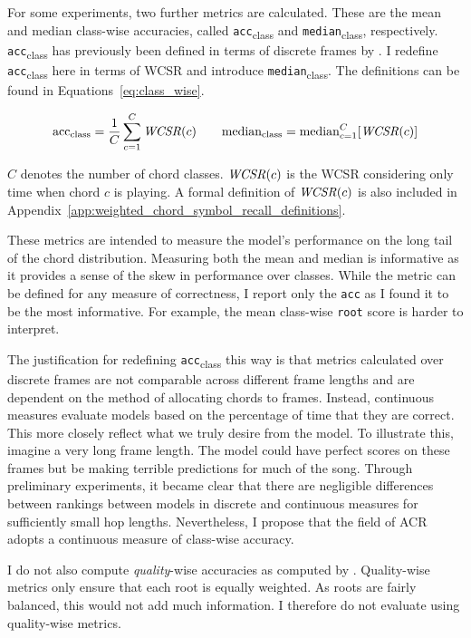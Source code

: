 For some experiments, two further metrics are calculated. These are the mean and median class-wise accuracies, called \texttt{acc}\textsubscript{class} and \texttt{median}\textsubscript{class}, respectively. \texttt{acc}\textsubscript{class} has previously been defined in terms of discrete frames by \citet{ACRLargeVocab1}. I redefine \texttt{acc}\textsubscript{class} here in terms of WCSR and introduce \texttt{median}\textsubscript{class}. The definitions can be found in Equations~\ref{eq:class_wise}.

\begin{equation}\label{eq:class_wise}
    \text{acc}\textsubscript{class} = \frac{1}{C} \sum_{c=1}^{C} \text{\emph{WCSR}}(c)
\quad \quad
    \text{median}\textsubscript{class} = \text{median}_{c=1}^{C} [\text{\emph{WCSR}}(c)]
\end{equation}

$C$ denotes the number of chord classes. $\text{\emph{WCSR}}(c)$ is the WCSR considering only time when chord $c$ is playing. A formal definition of $\text{\emph{WCSR}}(c)$ is also included in Appendix~\ref{app:weighted_chord_symbol_recall_definitions}.

These metrics are intended to measure the model's performance on the long tail of the chord distribution. Measuring both the mean and median is informative as it provides a sense of the skew in performance over classes. While the metric can be defined for any measure of correctness, I report only the \texttt{acc} as I found it to be the most informative. For example, the mean class-wise \texttt{root} score is harder to interpret.

The justification for redefining \texttt{acc}\textsubscript{class} this way is that metrics calculated over discrete frames are not comparable across different frame lengths and are dependent on the method of allocating chords to frames. Instead, continuous measures evaluate models based on the percentage of time that they are correct. This more closely reflect what we truly desire from the model. To illustrate this, imagine a very long frame length. The model could have perfect scores on these frames but be making terrible predictions for much of the song. Through preliminary experiments, it became clear that there are negligible differences between rankings between models in discrete and continuous measures for sufficiently small hop lengths. Nevertheless, I propose that the field of ACR adopts a continuous measure of class-wise accuracy.

I do not also compute \emph{quality}-wise accuracies as computed by \citet{CurriculumLearning}. Quality-wise metrics only ensure that each root is equally weighted. As roots are fairly balanced, this would not add much information. I therefore do not evaluate using quality-wise metrics.


